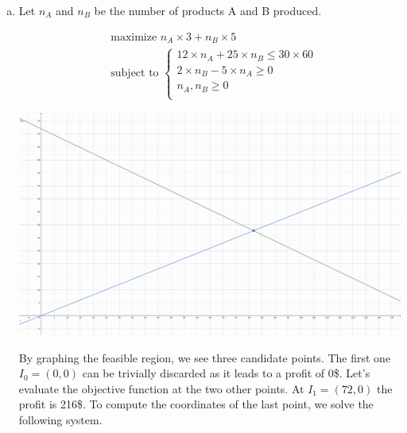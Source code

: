 \documentclass[a4paper, 10pt, twoside]{article}
\begin{document}
\begin{enumerate}[a)]
    \item

          Let $n_{A}$ and $n_{B}$ be the number of products A and B produced.

          \begin{align*}
               & \text{maximize } n_{A} \times 3 + n_{B} \times 5 \\
               & \text{subject to }
              \begin{cases}
                  12 \times n_{A} + 25 \times n_{B} \le 30 \times 60 \\
                  2 \times n_{B} - 5 \times n_{A} \ge 0              \\
                  n_{A}, n_{B} \ge 0                                 \\
              \end{cases}
          \end{align*}

          \begin{center}
              \includegraphics[width = .5 \textwidth]{graph.png}
          \end{center}

          By graphing the feasible region, we see three candidate points. The first one $I_0 = (0, 0)$ can be trivially discarded as it leads to a profit of 0\$. Let's evaluate the objective function at the two other points. At $I_1 = (72, 0)$ the profit is 216\$. To compute the coordinates of the last point, we solve the following system.



\end{enumerate}
\end{document}
